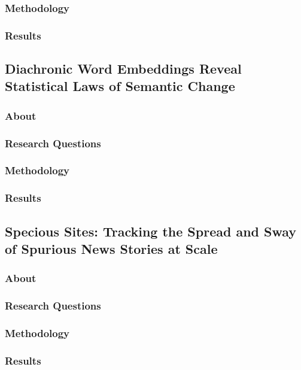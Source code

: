 \subsubsection{Methodology}

\subsubsection{Results}

\subsection{Diachronic Word Embeddings Reveal Statistical Laws of Semantic Change}\label{subsec:diachronic-word-embeddings-reveal-statistical-laws-of-semantic-change}
\subsubsection{About}
\subsubsection{Research Questions}
\subsubsection{Methodology}
\subsubsection{Results}

\subsection{Specious Sites: Tracking the Spread and Sway of Spurious News Stories at Scale}\label{subsec:specious-sites:-tracking-the-spread-and-sway-of-spurious-news-stories-at-scale}
\subsubsection{About}
\subsubsection{Research Questions}
\subsubsection{Methodology}
\subsubsection{Results}